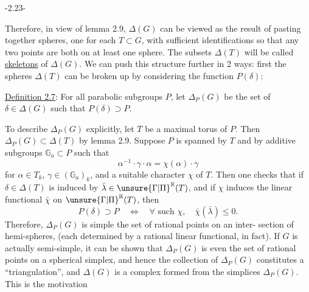 \begin{center}-2.23-\end{center}
Therefore, in view of lemma 2.9, $\Delta(G)$ can be viewed as the result of pasting together spheres, one for each $T\subset G$, with sufficient identifications so that any two points are both on at least one sphere. The subsets $\Delta(T)$ will be called \uline{skeletons} of $\Delta(G)$. We can push this structure further in 2 ways: first the spheres $\Delta(T)$ can be broken up by considering the function $P(\delta)$:

\uline{Definition 2.7}: For all parabolic subgroups $P$, let $\Delta_P(G)$ be the set of $\delta\in\Delta(G)$ such that $P(\delta)\supset P$.

To describe $\Delta_P(G)$ explicitly, let $T$ be a maximal torus of $P$. Then $\Delta_P(G)\subset\Delta(T)$ by lemma 2.9. Suppose $P$ is spanned by $T$ and by additive subgroups $\mathbb G_a\subset P$ such that
\[
\alpha^{-1}\cdot\gamma\cdot\alpha=\chi(\alpha)\cdot\gamma
\]
for $\alpha\in T_k$, $\gamma\in(\mathbb G_a)_k$, and a suitable character $\chi$ of $T$. Then one checks that if $\delta\in\Delta(T)$ is induced by $\bar\lambda\in\unsure{\Gamma|\Pi}^{\mathbb R}(T)$, and if $\chi$ induces the linear functional $\bar\chi$ on $\unsure{\Gamma|\Pi}^{\mathbb R}(T)$, then
\[
P(\delta)\supset P\quad\Longleftrightarrow\quad\forall\text{ such }\chi,\quad\bar\chi(\bar\lambda)\leq0.
\]
Therefore, $\Delta_P(G)$ is simple the set of rational points on an inter-
section of hemi-spheres, (each determined by a rational linear functional, in fact). If $G$ is actually semi-simple, it can be shown that $\Delta_P(G)$ is even the set of rational points on a spherical simplex, and hence the collection of $\Delta_P(G)$ constitutes a ``triangulation'', and $\Delta(G)$ is a complex formed from the simplices $\Delta_P(G)$. This is the motivation
